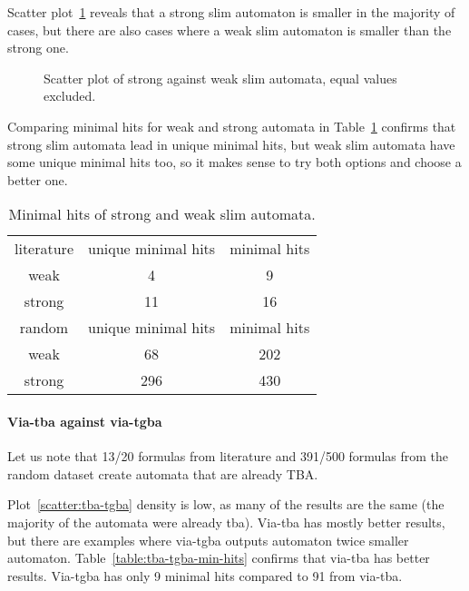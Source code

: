 \documentclass[
	digital,
nolof, nolot
]{fithesis3}
\begin{document}
	Scatter plot~\ref{scatter:weakstrong} reveals that a strong slim automaton is smaller in the majority of cases, but there are also cases where a weak slim automaton is smaller than the strong one.
		\begin{figure}[ht]
			
			\centering 
			\caption{Scatter plot of strong against weak slim automata, equal values excluded. }
			\label{scatter:weakstrong}
		\begin{tikzpicture}
			
		\end{tikzpicture}
	\end{figure}
	
		Comparing minimal hits for weak and strong automata in Table~\ref{table:weakstrongminhits} confirms that strong slim automata lead in unique minimal hits, but weak slim automata have some unique minimal hits too, so it makes sense to try both options and choose a better one. 
		\begin{table}[ht]
			\centering
			
			\caption{Minimal hits of strong and weak slim automata.}
			\label{table:weakstrongminhits}
			\begin{tabular}{ |c||c|c| } 
				\hline
				literature&unique minimal hits&minimal hits\\
				\hhline{|===|}
				weak&4 & 9\\
				\hline
				strong&11 & 16\\ 
				\hline
				\hline
				random&unique minimal hits&minimal hits\\
				\hhline{|===|}
				weak&68 & 202\\
				\hline
				strong&296 & 430\\ 
				\hline
			\end{tabular}
		\end{table}

		\paragraph{Via-tba against via-tgba}
		Let us note that 13/20 formulas from literature and 391/500 formulas from the random dataset create automata that are already TBA.
		
		Plot~\ref{scatter:tba-tgba} density is low, as many of the results are the same (the majority of the automata were already tba). Via-tba has mostly better results, but there are examples where via-tgba outputs automaton twice smaller automaton. Table~\ref{table:tba-tgba-min-hits} confirms that via-tba has better results. Via-tgba has only 9 minimal hits compared to 91 from via-tba.
		
\end{document}
